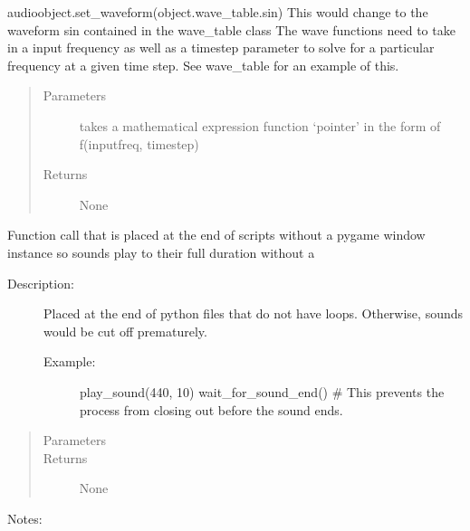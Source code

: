 \documentclass[letterpaper,10pt,english,openany,oneside]{sphinxmanual}
\begin{document}
\begin{fulllineitems}
\begin{fulllineitems}
\begin{description}
\sphinxAtStartPar
audioobject.set\_waveform(object.wave\_table.sin)
This would change to the waveform sin contained in the wave\_table class
The wave functions need to take in a input frequency as well as a timestep parameter
to solve for a particular frequency at a given time step. See wave\_table for an example of this.

\end{description}
\begin{quote}\begin{description}
\item[{Parameters}] \leavevmode
\sphinxAtStartPar
{} \textendash{} takes a mathematical expression function ‘pointer’ in the form of f(inputfreq, timestep)

\item[{Returns}] \leavevmode
\sphinxAtStartPar
None

\end{description}\end{quote}

\end{fulllineitems}



\begin{fulllineitems}
\sphinxAtStartPar
Function call that is placed at the end of scripts without a pygame window instance so sounds play to their full duration without a
\begin{description}
\item[{Description:}] \leavevmode
\sphinxAtStartPar
Placed at the end of python files that do not have loops. Otherwise, sounds would be cut off prematurely.
\begin{description}
\item[{Example:}] \leavevmode
\sphinxAtStartPar
play\_sound(440, 10)
wait\_for\_sound\_end() \# This prevents the process from closing out before the sound ends.

\end{description}

\end{description}
\begin{quote}\begin{description}
\item[{Parameters}] \leavevmode
\sphinxAtStartPar
{} \textendash{} 

\item[{Returns}] \leavevmode
\sphinxAtStartPar
None

\end{description}\end{quote}

\sphinxAtStartPar
Notes:

\end{fulllineitems}


\end{fulllineitems}
\end{document}

